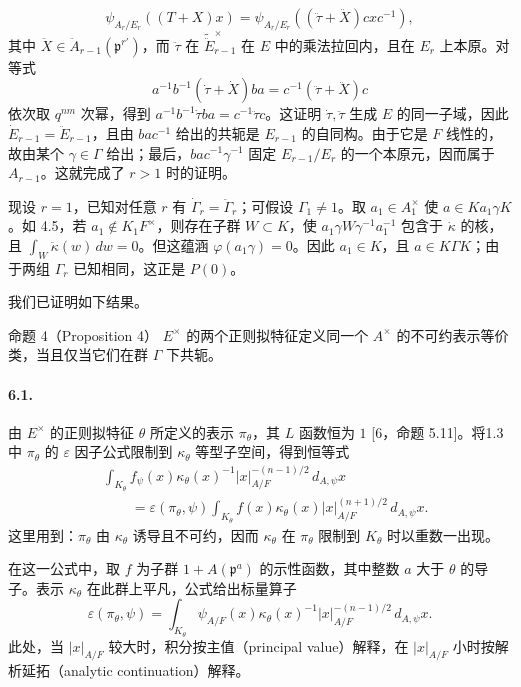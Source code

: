 \[
\psi_{A_r/E_r}((T+X)x)=\psi_{A_r/E_r}((\ddot\tau+\ddot X)cxc^{-1}),
\]
其中 $\ddot X\in\ddot A_{r-1}(\mathfrak p^{r'})$，而 $\ddot\tau$ 在 $\widetilde{\ddot E}_{r-1}^\times$ 在 $E$ 中的乘法拉回内，且在 $E_r$ 上本原。对等式
\[
a^{-1}b^{-1}(\dot\tau+\dot X)ba=c^{-1}(\ddot\tau+\ddot X)c
\]
依次取 $q^{nm}$ 次幂，得到 $a^{-1}b^{-1}\dot\tau ba=c^{-1}\ddot\tau c$。这证明 $\dot\tau,\ddot\tau$ 生成 $E$ 的同一子域，因此 $\dot E_{r-1}=\ddot E_{r-1}$，且由 $bac^{-1}$ 给出的共轭是 $E_{r-1}$ 的自同构。由于它是 $F$ 线性的，故由某个 $\gamma\in\Gamma$ 给出；最后，$bac^{-1}\gamma^{-1}$ 固定 $E_{r-1}/E_r$ 的一个本原元，因而属于 $A_{r-1}$。这就完成了 $r>1$ 时的证明。

现设 $r=1$，已知对任意 $r$ 有 $\dot\Gamma_r=\ddot\Gamma_r$；可假设 $\Gamma_1\ne1$。取 $a_1\in A_1^\times$ 使 $a\in Ka_1\gamma K$。如 4.5，若 $a_1\notin K_1F^\times$，则存在子群 $W\subset K$，使 $a_1\gamma W\gamma^{-1}a_1^{-1}$ 包含于 $\dot\kappa$ 的核，且 $\int_W\ddot\kappa(w)\,dw=0$。但这蕴涵 $\varphi(a_1\gamma)=0$。因此 $a_1\in K$，且 $a\in K\Gamma K$；由于两组 $\Gamma_r$ 已知相同，这正是 $P(0)$。

我们已证明如下结果。
\begin{originaltheorem}{命题 4（Proposition 4）}
$E^\times$ 的两个正则拟特征定义同一个 $A^\times$ 的不可约表示等价类，当且仅当它们在群 $\Gamma$ 下共轭。
\end{originaltheorem}

\paragraph*{6.1.}由 $E^\times$ 的正则拟特征 $\theta$ 所定义的表示 $\pi_\theta$，其 $L$ 函数恒为 $1$ [6，命题 5.11]。将1.3中 $\pi_\theta$ 的 $\varepsilon$ 因子公式限制到 $\kappa_\theta$ 等型子空间，得到恒等式
\[
\begin{aligned}
&\int_{K_\theta}f_\psi(x)\kappa_\theta(x)^{-1}|x|_{A/F}^{-(n-1)/2}\,d_{A,\psi}x\\
&\qquad=\varepsilon(\pi_\theta,\psi)\int_{K_\theta}f(x)\kappa_\theta(x)|x|_{A/F}^{(n+1)/2}\,d_{A,\psi}x.
\end{aligned}
\]
这里用到：$\pi_\theta$ 由 $\kappa_\theta$ 诱导且不可约，因而 $\kappa_\theta$ 在 $\pi_\theta$ 限制到 $K_\theta$ 时以重数一出现。

在这一公式中，取 $f$ 为子群 $1+A(\mathfrak p^a)$ 的示性函数，其中整数 $a$ 大于 $\theta$ 的导子。表示 $\kappa_\theta$ 在此群上平凡，公式给出标量算子
\[
\varepsilon(\pi_\theta,\psi)=\int_{K_\theta}\psi_{A/F}(x)\kappa_\theta(x)^{-1}|x|_{A/F}^{-(n-1)/2}\,d_{A,\psi}x.
\]
此处，当 $|x|_{A/F}$ 较大时，积分按主值（principal value）解释，在 $|x|_{A/F}$ 小时按解析延拓（analytic continuation）解释。
